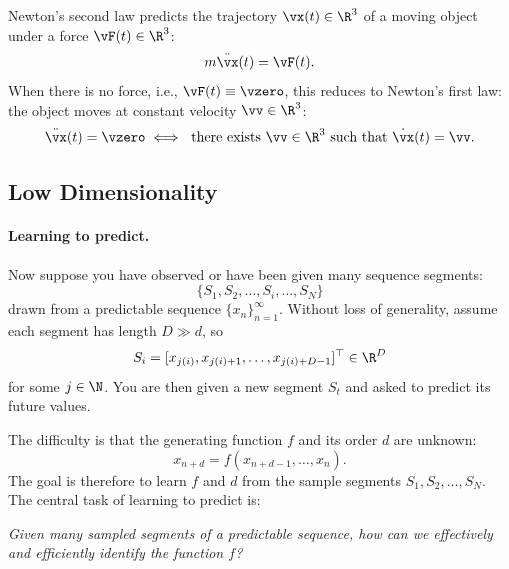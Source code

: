 \documentclass[../../book-main.tex]{subfiles}
\begin{document}
\begin{example}
    Newton's second law predicts the trajectory \(\vx(t) \in \R^{3}\)
    of a moving object under a force \(\vF(t) \in \R^{3}\):
    \begin{equation}
        m\ddot{\vx}(t) = \vF(t).
        \label{eqn:newton-second}
    \end{equation}
    When there is no force, i.e., \(\vF(t) \equiv \vzero\), this
    reduces to Newton's first law: the object moves at constant
    velocity \(\vv \in \R^{3}\):
    \begin{equation}
        \ddot{\vx}(t) = \vzero \iff \ \text{there exists } \vv \in
        \R^{3} \text{ such that } \dot{\vx}(t) = \vv.
        \label{eqn:newton-first}
    \end{equation}
\end{example}

\subsection{Low Dimensionality}\label{sec:intro-low-dimensionality}
\paragraph{Learning to predict.}
Now suppose you have observed or have been given many sequence segments:
\begin{equation}
    \{S_{1}, S_{2}, \ldots, S_{i}, \ldots, S_{N}\}
\end{equation}
drawn from a predictable sequence \(\{x_{n}\}_{n=1}^{\infty}\).
Without loss of generality, assume each segment has length \(D \gg d\), so
\begin{equation}
    S_{i} = [x_{j(i)}, x_{j(i)+1}, \ldots, x_{j(i)+D-1}]^{\top} \in \R^{D}
\end{equation}
for some \(j \in \N\). You are then given a new segment \(S_{t}\) and
asked to predict its future values.

The difficulty is that the generating function \(f\) and its order
\(d\) are unknown:
\begin{equation}
    x_{n+d} = f(x_{n+d-1}, \ldots, x_{n}).
    \label{eqn:sequence-order-d}
\end{equation}
The goal is therefore to learn \(f\) and \(d\) from the sample
segments \(S_{1}, S_{2}, \ldots, S_{N}\). The central task of
learning to predict is:
\begin{center}
    \textit{Given many sampled segments of a predictable sequence,
    how can we effectively and efficiently identify the function \(f\)?}
\end{center}
\end{document}
